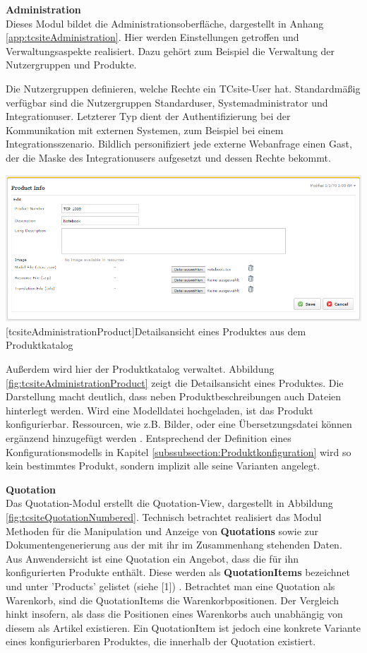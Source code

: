 \documentclass[12pt,a4paper,bibliography=totocnumbered,listof=totoc]{scrartcl}
\begin{document}
\textbf{Administration}\\
Dieses Modul bildet die Administrationsoberfläche, dargestellt in Anhang \ref{app:tcsiteAdministration}. Hier werden Einstellungen getroffen und Verwaltungsaspekte realisiert. Dazu gehört zum Beispiel die Verwaltung der Nutzergruppen und Produkte.

Die Nutzergruppen definieren, welche Rechte ein TCsite-User hat. Standardmäßig verfügbar sind die Nutzergruppen \glqq Standarduser\grqq{}, \glqq Systemadministrator\grqq{} und \glqq Integrationuser\grqq{}. Letzterer Typ dient der Authentifizierung bei der Kommunikation mit externen Systemen, zum Beispiel bei einem Integrationsszenario. Bildlich personifiziert jede externe Webanfrage einen Gast, der die Maske des Integrationusers aufgesetzt und dessen Rechte bekommt.

\vspace{1em}
\begin{minipage}{\linewidth}
	\centering
	\includegraphics[width=0.6\linewidth]{Abbildungen/tcsiteAdministrationProduct.PNG}
	[tcsiteAdministrationProduct]{Detailsansicht eines Produktes aus dem Produktkatalog}
	\label{fig:tcsiteAdministrationProduct}
\end{minipage}
\vspace{1em}

Außerdem wird hier der Produktkatalog verwaltet. Abbildung \ref{fig:tcsiteAdministrationProduct} zeigt die Detailsansicht eines Produktes. Die Darstellung macht deutlich, dass neben Produktbeschreibungen auch Dateien hinterlegt werden. Wird eine Modelldatei hochgeladen, ist das Produkt konfigurierbar. Ressourcen, wie z.B. Bilder, oder eine Übersetzungsdatei können ergänzend hinzugefügt werden \citep{tactonTCsiteReferenceManual}. Entsprechend der Definition eines Konfigurationsmodells in Kapitel \ref{subssubsection:Produktkonfiguration} wird so kein bestimmtes Produkt, sondern implizit alle seine Varianten angelegt.

\textbf{Quotation}\\
Das Quotation-Modul erstellt die Quotation-View, dargestellt in Abbildung \ref{fig:tcsiteQuotationNumbered}. Technisch betrachtet realisiert das Modul Methoden für die Manipulation und Anzeige von \textbf{Quotations} sowie zur Dokumentengenerierung aus der mit ihr im Zusammenhang stehenden Daten. Aus Anwendersicht ist eine Quotation ein Angebot, dass die für ihn konfigurierten Produkte enthält. Diese werden als \textbf{QuotationItems} bezeichnet und unter 'Products' gelistet (siehe [1]) \citep{tactonTCsiteDevelopmentManual}. Betrachtet man eine Quotation als Warenkorb, sind die QuotationItems die Warenkorbpositionen. Der Vergleich hinkt insofern, als dass die Positionen eines Warenkorbs auch unabhängig von diesem als Artikel existieren. Ein QuotationItem ist jedoch eine konkrete Variante eines konfigurierbaren Produktes, die innerhalb der Quotation existiert.
\end{document}
